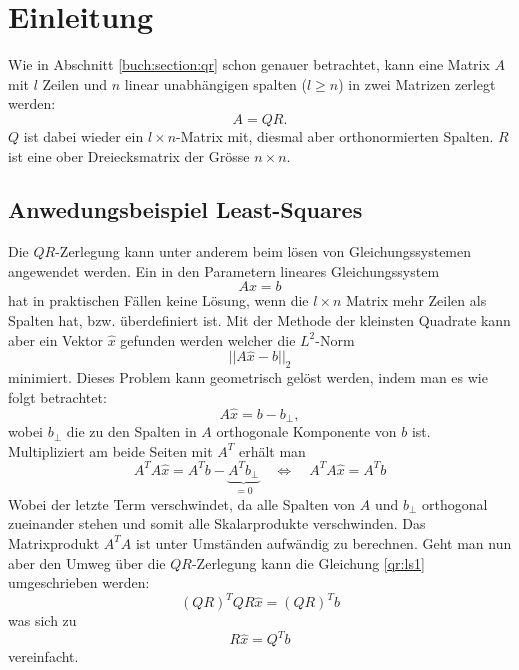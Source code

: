 %
%
%
\section{Einleitung\label{qr:section:einleitung}}
Wie in Abschnitt \ref{buch:section:qr} schon genauer betrachtet, kann eine Matrix $A$ mit $l$ Zeilen und $n$ linear unabhängigen spalten ($l\ge n$) in zwei Matrizen zerlegt werden:
\begin{equation*}
A=QR.
\end{equation*}
$Q$ ist dabei wieder ein $l\times n$-Matrix mit, diesmal aber orthonormierten Spalten.
$R$ ist eine ober Dreiecksmatrix der Grösse $n\times n$.

\subsection{Anwedungsbeispiel Least-Squares}
Die $QR$-Zerlegung kann unter anderem beim lösen von Gleichungssystemen angewendet werden.
Ein in den Parametern lineares Gleichungssystem
\begin{equation}
Ax=b\label{qr:sle}
\end{equation}
hat in praktischen Fällen keine Lösung, wenn die $l\times n$ Matrix mehr Zeilen als Spalten hat, bzw. überdefiniert ist.
Mit der Methode der kleinsten Quadrate kann aber ein Vektor $\hat{x}$ gefunden werden welcher die $L^2$-Norm
\begin{equation*}
||A\hat{x}-b||_2
\end{equation*}
minimiert.
Dieses Problem kann geometrisch gelöst werden, indem man es wie folgt betrachtet:
\begin{equation*}
A\hat{x}=b-b_{\perp},
\end{equation*}
wobei $b_{\perp}$ die zu den Spalten in $A$ orthogonale Komponente von $b$ ist.
Multipliziert am beide Seiten mit $A^T$ erhält man
\begin{equation}
A^TA\hat{x}=A^Tb-\underbrace{A^Tb_{\perp}}_{=0}
\quad\Leftrightarrow\quad A^TA\hat{x}=A^Tb \label{qr:ls1}
\end{equation}
Wobei der letzte Term verschwindet, da alle Spalten von $A$ und $b_{\perp}$ orthogonal zueinander stehen und somit alle Skalarprodukte verschwinden.
Das Matrixprodukt $A^TA$ ist unter Umständen aufwändig zu berechnen.
Geht man nun aber den Umweg über die $QR$-Zerlegung kann die Gleichung \ref{qr:ls1} umgeschrieben werden:
\begin{equation*}
(QR)^TQR\hat{x}=(QR)^Tb
\end{equation*}
was sich zu 
\begin{equation}
R\hat{x}=Q^Tb\label{qr:ls2}
\end{equation}
vereinfacht.
